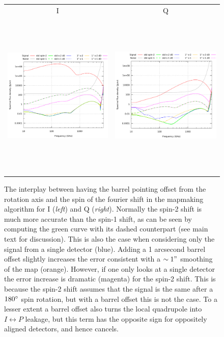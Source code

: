 \documentclass{article}
\begin{document}
\begin{figure}
	\centering
	\hspace*{-5mm}\begin{tabular}{cc}
		I & Q \\
		\includegraphics[height=80mm,clip,trim=0 0 6mm 0]{plots/spin_offset_T_abs_log_log.pdf} &
		\includegraphics[height=80mm,clip,trim=27mm 0 0 0]{plots/spin_offset_Q_abs_log_log.pdf}
	\end{tabular}
	\caption{The interplay between having the barrel pointing offset
	from the rotation axis and the spin of the fourier shift in the
	mapmaking algorithm for I (\emph{left}) and Q (\emph{right}).
	Normally the spin-2 shift is much more accurate than the spin-1
	shift, as can be seen by computing the green curve with its
	dashed counterpart (see main text for discussion). This
	is also the case when considering only the signal from a single
	detector (blue). Adding a 1 arcsecond barrel offset slightly
	increases the error consistent with a $\sim 1"$ smoothing
	of the map (orange). However, if one only looks at a single
	detector the error increase is dramatic (magenta) for
	the spin-2 shift. This is because the spin-2 shift assumes
	that the signal is the same after a $180\degree$ spin rotation,
	but with a barrel offset this is not the case. To a lesser extent
	a barrel offset also turns the local quadrupole into $I\leftrightarrow P$
	leakage, but this term has the opposite sign for oppositely aligned
	detectors, and hence cancels.}
\end{figure}
\end{document}
